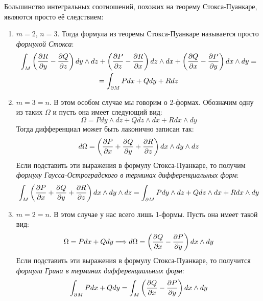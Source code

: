 \begin{corollary}
	Большинство интегральных соотношений, похожих на теорему Стокса-Пуанкаре, являются просто её следствием:
	\begin{enumerate}
		\item $m = 2$, $n = 3$. Тогда формула из теоремы Стокса-Пуанкаре называется просто \textit{формулой Стокса}:
		\begin{multline*}
			\int_M
			\left(\frac{\partial R}{\partial y} - \frac{\partial Q}{\partial z}\right) dy \wedge dz +
			\left(\frac{\partial P}{\partial z} - \frac{\partial R}{\partial x}\right) dz \wedge dx +
			\left(\frac{\partial Q}{\partial x} - \frac{\partial P}{\partial y}\right) dx \wedge dy = \\
			= \int_{\partial M} P dx + Q dy + R dz 
		\end{multline*}
		\item $m = 3 = n$. В этом особом случае мы говорим о 2-формах. Обозначим одну из таких $\Omega$ и пусть она имеет следующий вид:
		\[
			\Omega = P dy \wedge dz + Q dz \wedge dx + R dx \wedge dy
		\]
		Тогда дифференциал может быть лаконично записан так:
		\[
			d\Omega = \left(\frac{\partial P}{\partial x} + \frac{\partial Q}{\partial y} + \frac{\partial R}{\partial z}\right)dx \wedge dy \wedge dz
		\]
		Если подставить эти выражения в формулу Стокса-Пуанкаре, то получим \textit{формулу Гаусса-Остроградского в терминах дифференциальных форм}:
		\[
			\int_M \left(\frac{\partial P}{\partial x} + \frac{\partial Q}{\partial y} + \frac{\partial R}{\partial z}\right) dx \wedge dy \wedge dz = \int_{\partial M} P dy \wedge dz + Q dz \wedge dx + R dx \wedge dy
		\]
		
		\item $m = 2 = n$. В этом случае у нас всего лишь 1-формы. Пусть она имеет такой вид:
		\[
			\Omega = Pdx + Qdy \Longrightarrow d\Omega = \left(\frac{\partial Q}{\partial x} - \frac{\partial P}{\partial y}\right) dx \wedge dy
		\]
		Если подставить эти выражения в формулу Стокса-Пуанкаре, то получится \textit{формула Грина в терминах дифференциальных форм}:
		\[
			\int_{\partial M} Pdx + Qdy = \int_M \left(\frac{\partial Q}{\partial x} - \frac{\partial P}{\partial y}\right) dx \wedge dy
		\]
	\end{enumerate}
\end{corollary}

